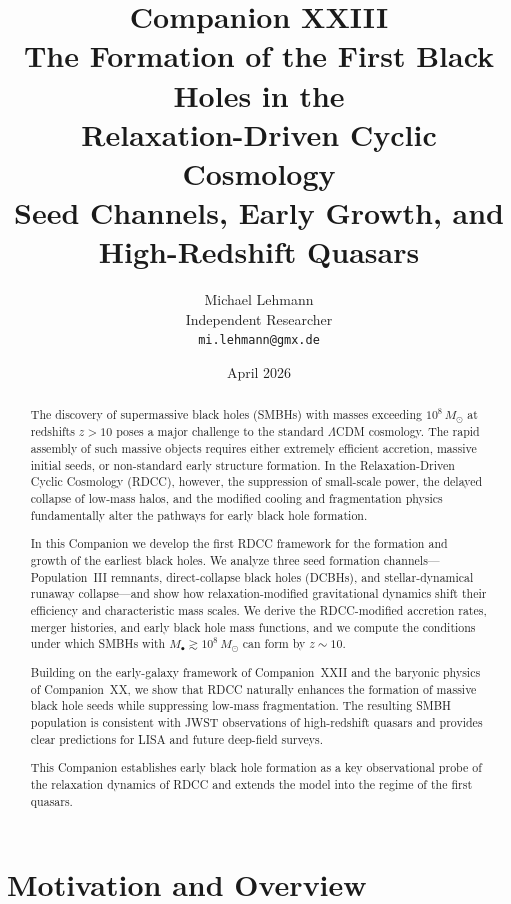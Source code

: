 \documentclass[11pt,a4paper]{article}
\title{
\textbf{Companion XXIII}\\[4mm]
\textbf{The Formation of the First Black Holes in the}\\
\textbf{Relaxation-Driven Cyclic Cosmology}\\[2mm]
\textbf{Seed Channels, Early Growth, and High-Redshift Quasars}
}
\author{
Michael Lehmann\\
Independent Researcher\\
\texttt{mi.lehmann@gmx.de}
}
\date{April 2026}
\begin{document}
\maketitle

\begin{abstract}
The discovery of supermassive black holes (SMBHs) with masses exceeding 
$10^{8}\,M_{\odot}$ at redshifts $z > 10$ poses a major challenge to the standard 
$\Lambda$CDM cosmology. The rapid assembly of such massive objects requires either 
extremely efficient accretion, massive initial seeds, or non-standard early structure 
formation. In the Relaxation-Driven Cyclic Cosmology (RDCC), however, the suppression of 
small-scale power, the delayed collapse of low-mass halos, and the modified cooling and 
fragmentation physics fundamentally alter the pathways for early black hole formation.

In this Companion we develop the first RDCC framework for the formation and growth of the 
earliest black holes. We analyze three seed formation channels—Population~III remnants, 
direct-collapse black holes (DCBHs), and stellar-dynamical runaway collapse—and show how 
relaxation-modified gravitational dynamics shift their efficiency and characteristic mass 
scales. We derive the RDCC-modified accretion rates, merger histories, and early black hole 
mass functions, and we compute the conditions under which SMBHs with 
$M_{\bullet} \gtrsim 10^{8}\,M_{\odot}$ can form by $z \sim 10$.

Building on the early-galaxy framework of Companion~XXII and the baryonic physics of 
Companion~XX, we show that RDCC naturally enhances the formation of massive black hole seeds 
while suppressing low-mass fragmentation. The resulting SMBH population is consistent with 
JWST observations of high-redshift quasars and provides clear predictions for LISA and future 
deep-field surveys.

This Companion establishes early black hole formation as a key observational probe of the 
relaxation dynamics of RDCC and extends the model into the regime of the first quasars.
\end{abstract}

\section{Motivation and Overview}
\end{document}
